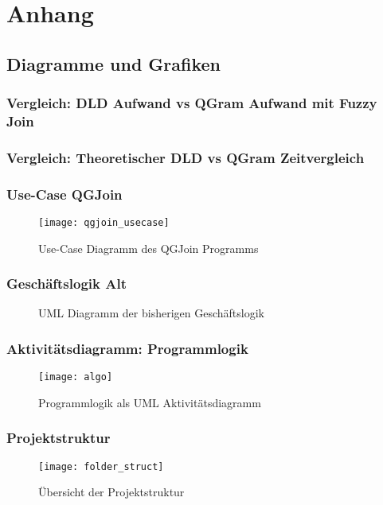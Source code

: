 \section{Anhang}
\subsection{Diagramme und Grafiken}
\subsubsection{Vergleich: DLD Aufwand vs QGram Aufwand mit Fuzzy Join}
\subsubsection{Vergleich: Theoretischer DLD vs QGram Zeitvergleich }
\subsubsection{Use-Case QGJoin}
\begin{figure}
	\caption{Use-Case Diagramm des QGJoin Programms}
	\label{fig:qgjoinUseCase}
	\texttt{[image: qgjoin\_usecase]}
\end{figure}

\subsubsection{Geschäftslogik Alt}
\begin{figure}
	\caption{UML Diagramm der bisherigen Geschäftslogik}
	\label{fig:businessLogicAlt}
\end{figure}



\subsubsection{Aktivitätsdiagramm: Programmlogik}
\begin{figure}[!htp]
	\caption{Programmlogik als UML Aktivitätsdiagramm}
	\label{fig:programmlogik}
	\texttt{[image: algo]}
	\centering
\end{figure}

\subsubsection{Projektstruktur}
\begin{figure}[!htp]
	\caption{Übersicht der Projektstruktur}
	\label{fig:folderstruct}
	\texttt{[image: folder\_struct]}
\end{figure}

